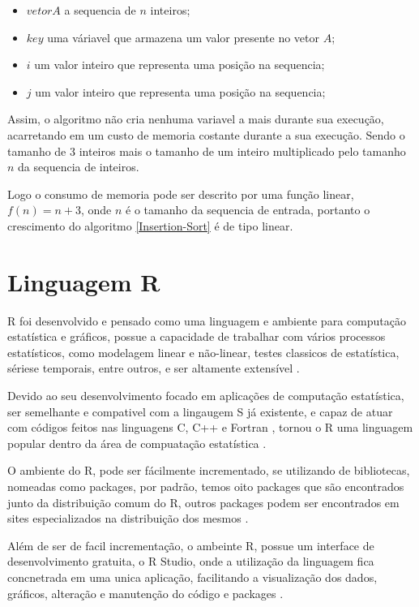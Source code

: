 \documentclass[
	12pt,				%
	openright,			%
	oneside,			%
	a4paper,			%
	english,			%
	brazil				%
	]{abntex2}
\begin{document}
\begin{itemize}
	\item $vetor A$ a sequencia de $n$ inteiros;
	\item $key$ uma váriavel que armazena um valor presente no vetor $A$;
	\item $i$ um valor inteiro que representa uma posição na sequencia;
	\item $j$ um valor inteiro que representa uma posição na sequencia;
\end{itemize}

Assim, o algoritmo não cria nenhuma variavel a mais durante sua execução, acarretando em um custo de memoria costante durante
a sua execução. Sendo o tamanho de 3 inteiros mais o tamanho de um inteiro multiplicado pelo tamanho $n$ da sequencia de
inteiros.

Logo o consumo de memoria pode ser descrito por uma função linear, $f(n) = n + 3$, onde $n$ é o tamanho da sequencia de
entrada, portanto o crescimento do algoritmo \ref{Insertion-Sort} é de tipo linear.

\section{Linguagem R}

R foi desenvolvido e pensado como uma linguagem e ambiente para computação estatística e gráficos, possue a capacidade
de trabalhar com vários processos estatísticos, como modelagem linear e não-linear, testes classicos de estatística,
sériese temporais, entre outros, e ser altamente extensível \cite{ling_r}.

Devido ao seu desenvolvimento focado em aplicações de computação estatística, ser semelhante e compativel 
com a lingaugem S já existente, e capaz de atuar com códigos feitos nas linguagens C, C++ e Fortran \cite{ling_r},
tornou o R uma linguagem popular dentro da área de compuatação estatística \cite{linguagem_r}.

O ambiente do R, pode ser fácilmente incrementado, se utilizando de bibliotecas, nomeadas como packages, por padrão,
temos oito packages que são encontrados junto da distribuição comum do R, outros packages podem ser encontrados em sites
especializados na distribuição dos mesmos \cite{ling_r}.

Além de ser de facil incrementação, o ambeinte R, possue um interface de desenvolvimento gratuita, o R Studio, onde
a utilização da linguagem fica concnetrada em uma unica aplicação, facilitando a visualização dos dados, gráficos, alteração
e manutenção do código e packages \cite{rstudio}.
\end{document}

